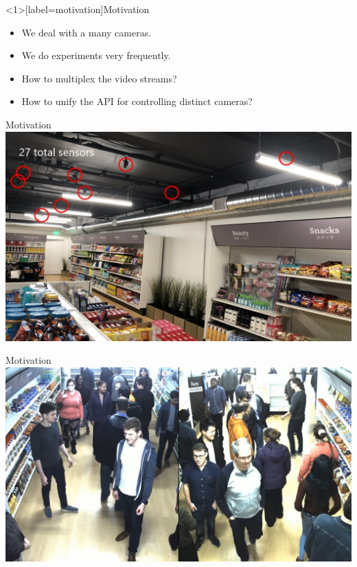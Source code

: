 \documentclass[aspectratio=43]{beamer}
\begin{document}
\begin{frame}<1>[label=motivation]{Motivation}
    \begin{itemize}
        \item<1-> We deal with a many cameras.
        \item<2-> We do experiments very frequently.
        \item<3-> How to multiplex the video streams?
        \item<4-> How to unify the API for controlling distinct cameras?
    \end{itemize}
\end{frame}
\begin{frame}{Motivation}
    \includegraphics[width=\textwidth]{./imgs/cameras.jpg}
\end{frame}
\begin{frame}{Motivation}
    \includegraphics[width=\textwidth]{./imgs/experiment.jpg}
\end{frame}
\end{document}
